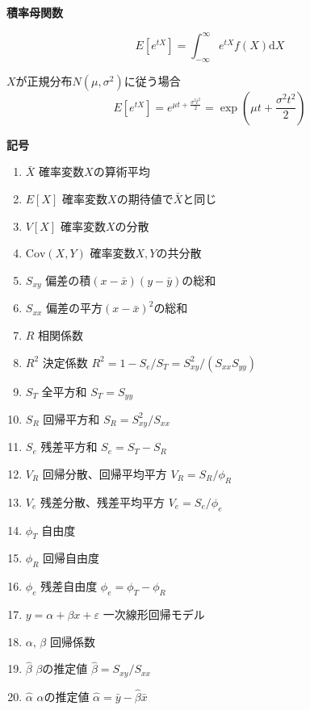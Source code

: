 \documentclass[12pt,b5paper]{ltjsarticle}
\begin{document}
\hrulefill

\textbf{積率母関数}

\begin{equation}
 E[e^{tX}]=\int_{-\infty}^{\infty}e^{tX}f(X)\mathrm{d}X
\end{equation}

$X$が正規分布$N(\mu,\sigma^2)$に従う場合
\begin{equation}
 E[e^{tX}]=e^{\mu t + \frac{\sigma^2t^2}{2}}
  =\exp\left(\mu t + \frac{\sigma^2t^2}{2}\right)
\end{equation}


\dotfill

\textbf{記号}

\begin{enumerate}
 \item $\bar{X}$ \quad 確率変数$X$の算術平均
 \item $E[X]$ \quad 確率変数$X$の期待値で$\bar{X}$と同じ
 \item $V[X]$ \quad 確率変数$X$の分散
 \item $\mathrm{Cov}(X,Y)$ \quad 確率変数$X,Y$の共分散
 \item $S_{xy}$ \quad 偏差の積$(x-\bar{x})(y-\bar{y})$の総和
 \item $S_{xx}$ \quad 偏差の平方$(x-\bar{x})^2$の総和
 \item $R$ \quad 相関係数
 \item $R^2$ \quad 決定係数 $R^2=1-S_e/S_T=S_{xy}^2/(S_{xx}S_{yy})$
 \item $S_T$ \quad 全平方和 $S_T=S_{yy}$
 \item $S_R$ \quad 回帰平方和 $S_R=S_{xy}^2/S_{xx}$
 \item $S_e$ \quad 残差平方和 $S_e=S_T-S_{R}$
 \item $V_R$ \quad 回帰分散、回帰平均平方 $V_R=S_R/\phi_R$
 \item $V_e$ \quad 残差分散、残差平均平方 $V_e=S_e/\phi_e$
 \item $\phi_T$ \quad 自由度
 \item $\phi_R$ \quad 回帰自由度
 \item $\phi_e$ \quad 残差自由度 $\phi_e = \phi_T-\phi_R$
 \item $y=\alpha + \beta x +\varepsilon$ \quad 一次線形回帰モデル
 \item $\alpha,\,\beta$ \quad 回帰係数
 \item $\hat{\beta}$ \quad $\beta$の推定値 $\hat{\beta}=S_{xy}/S_{xx}$
 \item $\hat{\alpha}$ \quad $\alpha$の推定値 $\hat{\alpha}=\bar{y}-\hat{\beta}\bar{x}$
\end{enumerate}
\end{document}
